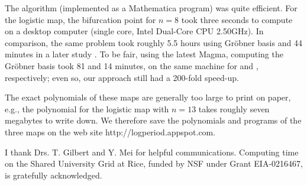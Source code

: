 \documentclass{ws-ijbc}
\begin{document}
The algorithm (implemented as a Mathematica program)
was quite efficient.
%
For the logistic map, the bifurcation point for $n = 8$
took three seconds to compute on a desktop computer
(single core, Intel\textsuperscript{\textregistered} Dual-Core CPU 2.50GHz).
%
In comparison,
  the same problem took roughly 5.5 hours \cite{kk1}
  using Gr\"obner basis
  and 44 minutes in a later study \cite{lewis}.
To be fair, using the latest Magma, computing the Gr\"obner basis
  took 81 and 14 minutes, on the same machine
  for  and , respectively;
even so, our approach still had a 200-fold speed-up.




%
The exact polynomials of these maps are generally too large to print on paper,
  e.g., the polynomial for the logistic map with $n = 13$
    takes roughly seven megabytes to write down.
%
We therefore save the polynomials and programs of the three maps on the web site
http://logperiod.appspot.com.





 \noindent
I thank Drs. T. Gilbert and Y. Mei for helpful communications.
Computing time on the Shared University Grid at Rice,
funded by NSF under Grant EIA-0216467, is gratefully acknowledged.







\end{document}
